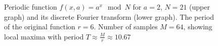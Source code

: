 \begin{figure}
\centering




\caption{Periodic function
  $f\left(x, a\right) = a^x \mod{N}$ for $a=2$, $N = 21$ (upper
  graph) and its discrete Fourier transform (lower graph).
  The period of the original function $r = 6$. Number of samples $M = 64$,
  showing local maxima with period $T \approx \frac{M}{r} \approx 10.67$}
\label{picAddFourierFourier}
\end{figure}